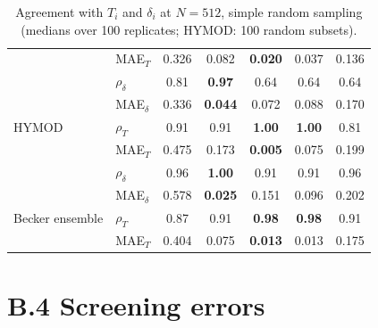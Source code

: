 \documentclass[11pt,a4paper]{article}
\begin{document}
\begin{table}[H]
\begin{tabular}{@{}llccccc@{}}
 & MAE$_T$ & 0.326 & 0.082 & \textbf{0.020} & 0.037 & 0.136 \\
 & $\rho_\delta$ & 0.81 & \textbf{0.97} & 0.64 & 0.64 & 0.64 \\
 & MAE$_\delta$ & 0.336 & \textbf{0.044} & 0.072 & 0.088 & 0.170 \\
\addlinespace[2pt]
HYMOD & $\rho_T$ & 0.91 & 0.91 & \textbf{1.00} & \textbf{1.00} & 0.81 \\
 & MAE$_T$ & 0.475 & 0.173 & \textbf{0.005} & 0.075 & 0.199 \\
 & $\rho_\delta$ & 0.96 & \textbf{1.00} & 0.91 & 0.91 & 0.96 \\
 & MAE$_\delta$ & 0.578 & \textbf{0.025} & 0.151 & 0.096 & 0.202 \\
\addlinespace[2pt]
Becker ensemble & $\rho_T$ & 0.87 & 0.91 & \textbf{0.98} & \textbf{0.98} & 0.91 \\
 & MAE$_T$ & 0.404 & 0.075 & \textbf{0.013} & 0.013 & 0.175 \\
\bottomrule\end{tabular}
\caption{Agreement with $T_i$ and $\delta_i$ at $N=512$, simple random sampling (medians over 100 replicates; HYMOD: 100 random subsets).}
\label{tab:agree_srs}
\end{table}

\section*{B.4 Screening errors}
\end{document}
